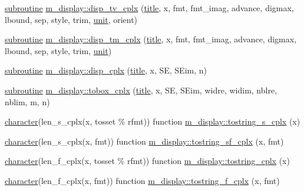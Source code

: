 \begin{DoxyCompactItemize}
\item 
\hyperlink{M__stopwatch_83_8txt_acfbcff50169d691ff02d4a123ed70482}{subroutine} \hyperlink{namespacem__display_af30a3037ae6a55f77dbe10461a11ad6c}{m\+\_\+display\+::disp\+\_\+tv\+\_\+cplx} (\hyperlink{print__watch_83_8txt_a15b5bd21156bb9fca6a755ab8c029a9c}{title}, x, fmt, fmt\+\_\+imag, advance, digmax, lbound, sep, style, trim, \hyperlink{M__stopwatch_83_8txt_a5cbef30eb7c0d734bd82f5a7ebea9aa7}{unit}, orient)
\item 
\hyperlink{M__stopwatch_83_8txt_acfbcff50169d691ff02d4a123ed70482}{subroutine} \hyperlink{namespacem__display_a1f26f388bc8d286db185f661f95fe233}{m\+\_\+display\+::disp\+\_\+tm\+\_\+cplx} (\hyperlink{print__watch_83_8txt_a15b5bd21156bb9fca6a755ab8c029a9c}{title}, x, fmt, fmt\+\_\+imag, advance, digmax, lbound, sep, style, trim, \hyperlink{M__stopwatch_83_8txt_a5cbef30eb7c0d734bd82f5a7ebea9aa7}{unit})
\item 
\hyperlink{M__stopwatch_83_8txt_acfbcff50169d691ff02d4a123ed70482}{subroutine} \hyperlink{namespacem__display_ae6588ffe4d1d6d1022c0b0017f4f70b7}{m\+\_\+display\+::disp\+\_\+cplx} (\hyperlink{print__watch_83_8txt_a15b5bd21156bb9fca6a755ab8c029a9c}{title}, x, SE, S\+Eim, n)
\item 
\hyperlink{M__stopwatch_83_8txt_acfbcff50169d691ff02d4a123ed70482}{subroutine} \hyperlink{namespacem__display_a95571f3e4015bb187bcc1785c76013f9}{m\+\_\+display\+::tobox\+\_\+cplx} (\hyperlink{print__watch_83_8txt_a15b5bd21156bb9fca6a755ab8c029a9c}{title}, x, SE, S\+Eim, widre, widim, nblre, nblim, m, n)
\item 
\hyperlink{option__stopwatch_83_8txt_abd4b21fbbd175834027b5224bfe97e66}{character}(len\+\_\+s\+\_\+cplx(x, tosset \% rfmt)) function \hyperlink{namespacem__display_ab2141edcb1746f1aa92e31ed07d597a8}{m\+\_\+display\+::tostring\+\_\+s\+\_\+cplx} (x)
\item 
\hyperlink{option__stopwatch_83_8txt_abd4b21fbbd175834027b5224bfe97e66}{character}(len\+\_\+s\+\_\+cplx(x, fmt)) function \hyperlink{namespacem__display_a2a7022ce15edf03ceccb423e9da40c87}{m\+\_\+display\+::tostring\+\_\+sf\+\_\+cplx} (x, fmt)
\item 
\hyperlink{option__stopwatch_83_8txt_abd4b21fbbd175834027b5224bfe97e66}{character}(len\+\_\+f\+\_\+cplx(x, tosset \% rfmt)) function \hyperlink{namespacem__display_a1b05d11dd12d88ce00f912751be126f3}{m\+\_\+display\+::tostring\+\_\+cplx} (x)
\item 
\hyperlink{option__stopwatch_83_8txt_abd4b21fbbd175834027b5224bfe97e66}{character}(len\+\_\+f\+\_\+cplx(x, fmt)) function \hyperlink{namespacem__display_af19de6a6efe76fa3dc9bd86a33f9321b}{m\+\_\+display\+::tostring\+\_\+f\+\_\+cplx} (x, fmt)

\end{DoxyCompactItemize}
